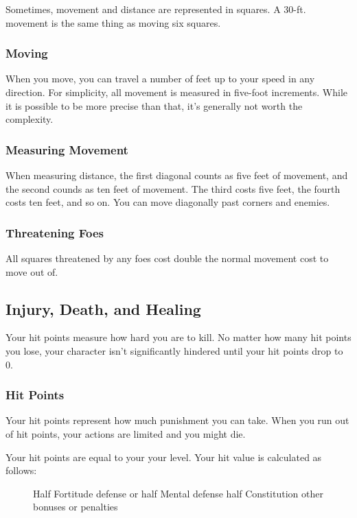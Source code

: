 Sometimes, movement and distance are represented in squares.
A 30-ft. movement is the same thing as moving six squares.

\subsubsection{Moving}

When you move, you can travel a number of feet up to your speed in any direction.
For simplicity, all movement is measured in five-foot increments.
While it is possible to be more precise than that, it's generally not worth the complexity.

\subsubsection{Measuring Movement}

 When measuring distance, the first diagonal counts as five feet of movement, and the second counds as ten feet of movement.
The third costs five feet, the fourth costs ten feet, and so on.
You can move diagonally past corners and enemies.

\subsubsection{Threatening Foes}
All squares threatened by any foes cost double the normal movement cost to move out of.

\subsection{Injury, Death, and Healing}\label{Injury, Death, and Healing}
Your hit points measure how hard you are to kill.
No matter how many hit points you lose, your character isn't significantly hindered until your hit points drop to 0.

\subsubsection{Hit Points}\label{Hit Points}
Your hit points represent how much punishment you can take.
When you run out of hit points, your actions are limited and you might die.

Your hit points are equal to your  \mtimes your level.
Your hit value is calculated as follows:

\begin{figure}[h]
    \centering Half Fortitude defense or half Mental defense \add half Constitution \add other bonuses or penalties
\end{figure}

